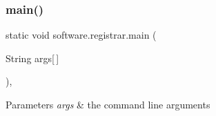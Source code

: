 \subsubsection{\texorpdfstring{main()}{main()}}
{\footnotesize\ttfamily static void software.\+registrar.\+main (\begin{DoxyParamCaption}\item[{String}]{args\mbox{[}$\,$\mbox{]} }\end{DoxyParamCaption})\hspace{0.3cm}{\ttfamily [inline]}, {\ttfamily [static]}}


\begin{DoxyParams}{Parameters}
{\em args} & the command line arguments \\
\hline
\end{DoxyParams}


